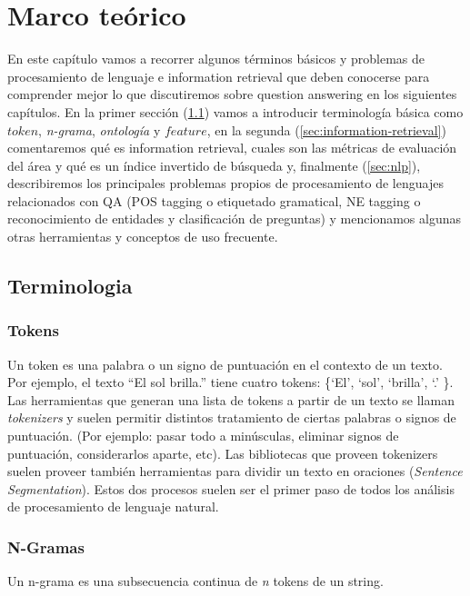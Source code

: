 \chapter{Marco teórico}
\label{chap:teorico}
En este capítulo vamos a recorrer algunos términos básicos y problemas de procesamiento de lenguaje e information retrieval que deben conocerse para comprender mejor lo que discutiremos sobre question answering en los siguientes capítulos. En la primer sección (\ref{sec:terminologia}) vamos a introducir terminología básica como $token$, \textit{n-grama}, \textit{ontología} y $feature$, en la segunda (\ref{sec:information-retrieval}) comentaremos qué es information retrieval, cuales son las métricas de evaluación del área y qué es un índice invertido de búsqueda y, finalmente (\ref{sec:nlp}), describiremos los principales problemas propios de procesamiento de lenguajes relacionados con QA (POS tagging o etiquetado gramatical, NE tagging o reconocimiento de entidades y clasificación de preguntas) y mencionamos algunas otras herramientas y conceptos de uso frecuente. 

\section{Terminologia}
\label{sec:terminologia}
\subsection*{Tokens}
Un token es una palabra o un signo de puntuación en el contexto de un texto.
Por ejemplo, el texto {\textquotedblleft}El sol
brilla.{\textquotedblright} tiene cuatro tokens:
\{{\textquoteleft}El{\textquoteright}, {\textquoteleft}sol{\textquoteright}, {\textquoteleft}brilla{\textquoteright}, {\textquoteleft}.{\textquoteright} \}. 
Las herramientas que generan una lista de tokens a partir de un texto se llaman
\textit{tokenizers} y suelen permitir distintos tratamiento de ciertas
palabras o signos de puntuación. (Por ejemplo: pasar todo a minúsculas, eliminar signos de puntuación, considerarlos aparte, etc).
Las bibliotecas que proveen tokenizers suelen proveer también herramientas para dividir un texto en
oraciones (\textit{Sentence Segmentation}). 
Estos dos procesos suelen ser el primer paso de todos los análisis de procesamiento de lenguaje natural.


\subsection*{N-Gramas}
Un n-grama es una subsecuencia continua de \textit{n} tokens de un string.

